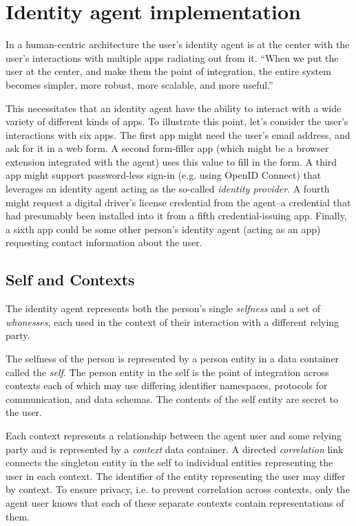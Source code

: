\documentclass[11pt, oneside]{article}   	%
\begin{document}
\section{Identity agent implementation} %

In a human-centric architecture the user's identity agent is at the center with the user's interactions with multiple apps radiating out from it. ``When we put the user at the center, and make them the point of integration, the entire system becomes simpler, more robust, more scalable, and more useful.''\cite{Andrieu2007}

This necessitates that an identity agent have the ability to interact with a wide variety of different kinds of apps. To illustrate this point, let's consider the user's interactions with six apps. The first app might need the user's email address, and ask for it in a web form. A second form-filler app (which might be a browser extension integrated with the agent) uses this value to fill in the form. A third app might support password-less sign-in (e.g. using OpenID Connect) that leverages an identity agent acting as the so-called \emph{identity provider}. A fourth might request a digital driver's license credential from the agent--a credential that had presumably been installed into it from a fifth credential-issuing app. Finally, a sixth app could be some other person's identity agent (acting as an app) requesting contact information about the user.

\subsection{Self and Contexts}

The identity agent represents both the person's single \emph{selfness} and a set of \emph{whonesses}, each used in the context of their interaction with a different relying party.

The selfness of the person is represented by a person entity in a data container called the \emph{self}. The person entity in the self is the point of integration across contexts each of which may use differing identifier namespaces, protocols for communication, and data schemas. The contents of the self entity are secret to the user. 

Each context represents a relationship between the agent user and some relying party and is represented by a \emph{context} data container. A directed \emph{correlation} link connects the singleton entity in the self to individual entities representing the user in each context. The identifier of the entity representing the user may differ by context. To ensure privacy, i.e. to prevent correlation across contexts, only the agent user knows that each of these separate contexts contain representations of them. 
\end{document}

